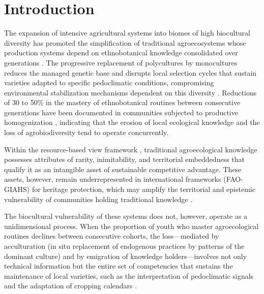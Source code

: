 \documentclass[12pt,a4paper]{article}
\begin{document}
\linenumbers

\section{Introduction}
\label{sec:intro}

The expansion of intensive agricultural systems into biomes of high biocultural diversity has promoted the simplification of traditional agroecosystems whose production systems depend on ethnobotanical knowledge consolidated over generations \citep{Altieri2004}. The progressive replacement of polycultures by monocultures reduces the managed genetic base and disrupts local selection cycles that sustain varieties adapted to specific pedoclimatic conditions, compromising environmental stabilization mechanisms dependent on this diversity \citep{Jarvis2008}. Reductions of 30 to 50\% in the mastery of ethnobotanical routines between consecutive generations have been documented in communities subjected to productive homogenization \citep{ReyesGarcia2013}, indicating that the erosion of local ecological knowledge and the loss of agrobiodiversity tend to operate concurrently.

Within the resource-based view framework \citep{Barney1991}, traditional agroecological knowledge possesses attributes of rarity, inimitability, and territorial embeddedness that qualify it as an intangible asset of sustainable competitive advantage. These assets, however, remain underrepresented in international frameworks (FAO-GIAHS) for heritage protection, which may amplify the territorial and epistemic vulnerability of communities holding traditional knowledge \citep{Santilli2009,Cunha2009,Goncalves2022}.

The biocultural vulnerability of these systems does not, however, operate as a unidimensional process. When the proportion of youth who master agroecological routines declines between consecutive cohorts, the loss---mediated by acculturation (in situ replacement of endogenous practices by patterns of the dominant culture) and by emigration of knowledge holders---involves not only technical information but the entire set of competencies that sustains the maintenance of local varieties, such as the interpretation of pedoclimatic signals and the adaptation of cropping calendars \citep{GomezBaggethun2013}.
\end{document}
